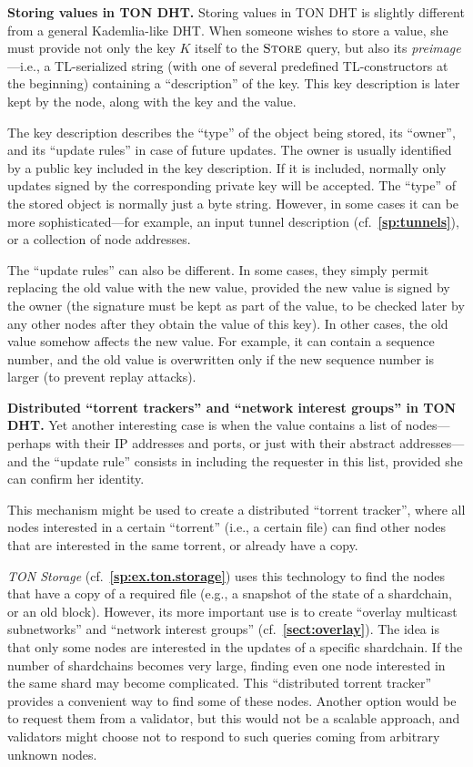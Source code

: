 \documentclass[12pt,oneside]{article}
\def\makepoint#1{\medbreak\noindent{\bf #1.\ }}
\def\nxsubpoint{\refstepcounter{subsubsection}%
  \smallbreak\makepoint{\thesubsubsection}}
\def\refpoint#1{{\rm\textbf{\ref{#1}}}}
\let\ptref=\refpoint
\def\embt(#1.){\textbf{#1.}}
\def\opsc#1{\operatorname{\textsc{#1}}}
\def\Store{\opsc{Store}}
\begin{document}
\nxsubpoint\label{sp:DHT.store} \embt(Storing values in TON DHT.)
Storing values in TON DHT is slightly different from a general
Kademlia-like DHT. When someone wishes to store a value, she must
provide not only the key $K$ itself to the $\Store$ query, but also
its {\em preimage\/}---i.e., a TL-serialized string (with one of
several predefined TL-constructors at the beginning) containing a
``description'' of the key. This key description is later kept by the
node, along with the key and the value.

The key description describes the ``type'' of the object being stored,
its ``owner'', and its ``update rules'' in case of future updates. The
owner is usually identified by a public key included in the key
description. If it is included, normally only updates signed by the
corresponding private key will be accepted. The ``type'' of the stored
object is normally just a byte string. However, in some cases it can
be more sophisticated---for example, an input tunnel description
(cf.~\ptref{sp:tunnels}), or a collection of node addresses.

The ``update rules'' can also be different. In some cases, they simply
permit replacing the old value with the new value, provided the new
value is signed by the owner (the signature must be kept as part of
the value, to be checked later by any other nodes after they obtain
the value of this key). In other cases, the old value somehow affects
the new value. For example, it can contain a sequence number, and the
old value is overwritten only if the new sequence number is larger (to
prevent replay attacks).

\nxsubpoint\label{sp:distr.torr.tr} \embt(Distributed ``torrent
trackers'' and ``network interest groups'' in TON DHT.)  Yet another
interesting case is when the value contains a list of nodes---perhaps
with their IP addresses and ports, or just with their abstract
addresses---and the ``update rule'' consists in including the
requester in this list, provided she can confirm her identity.

This mechanism might be used to create a distributed ``torrent
tracker'', where all nodes interested in a certain ``torrent'' (i.e.,
a certain file) can find other nodes that are interested in the same
torrent, or already have a copy.

{\em TON Storage\/} (cf.~\ptref{sp:ex.ton.storage}) uses this
technology to find the nodes that have a copy of a required file
(e.g., a snapshot of the state of a shardchain, or an old
block). However, its more important use is to create ``overlay
multicast subnetworks'' and ``network interest groups''
(cf.~\ptref{sect:overlay}). The idea is that only some nodes are
interested in the updates of a specific shardchain. If the number of
shardchains becomes very large, finding even one node interested in
the same shard may become complicated. This ``distributed torrent
tracker'' provides a convenient way to find some of these
nodes. Another option would be to request them from a validator, but
this would not be a scalable approach, and validators might choose not
to respond to such queries coming from arbitrary unknown nodes.
\end{document}
